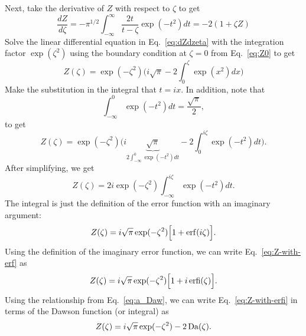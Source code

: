 Next, take the derivative of $Z$ with respect to $\zeta$ to get
\begin{equation}
	\frac{dZ}{d\zeta} = - \pi^{1/2} \int_{-\infty}^\infty
	\frac{2 t}{t-\zeta} \exp(-t^2)dt 
	= -2(1+\zeta Z) %
	\label{eq:dZdzeta}
\end{equation}
Solve the linear differential equation in Eq.~\ref{eq:dZdzeta} with the integration factor $\exp(\zeta^2)$ using the boundary condition at $\zeta=0$ from Eq.~\ref{eq:Z0} to get
\begin{equation}
	Z(\zeta) = \exp(-\zeta^2)
	\bigg( i\sqrt{\pi} - 2 \int_0^\zeta \exp(x^2)dx  \bigg)
\end{equation}
Make the substitution in the integral that $t = ix$. In addition, note that
\begin{equation}
	\int_{-\infty}^0 \exp(-t^2) dt = \frac{\sqrt{\pi}}{2},
\end{equation}
to get
\begin{equation}
	Z(\zeta) = \exp(-\zeta^2)
	\bigg( i\underbrace{\sqrt{\pi}}_{2\int_{-\infty}^0 \exp(-t^2)dt} - 2 \int_0^{i\zeta} \exp(-t^2)dt  \bigg).
\end{equation}
After simplifying, we get
\begin{equation}
	Z(\zeta) = 2i \exp(-\zeta^2) \int_{-\infty}^{i\zeta} \exp(-t^2)dt.
\end{equation}
The integral is just the definition of the error function with an imaginary argument:
\begin{equation}
	Z(\zeta) = i \sqrt{\pi} \exp(-\zeta^2) \Big[ 1 + \operatorname{erf}(i\zeta) \Big].
	\label{eq:Z-with-erf}
\end{equation}
Using the definition of the imaginary error function, we can write Eq.~\ref{eq:Z-with-erf} as
\begin{equation}
	Z(\zeta) = i\sqrt{\pi} \exp(-\zeta^2) \Big[ 1+i\operatorname{erfi}(\zeta) \Big].
	\label{eq:Z-with-erfi}
\end{equation}
Using the relationship from Eq.~\ref{eq:a_Daw}, we can write Eq.~\ref{eq:Z-with-erfi} in terms of the Dawson function (or integral) as
\begin{equation}
	Z(\zeta) = i \sqrt{\pi} \exp(-\zeta^2) - 2 \operatorname{Da}(\zeta).
	\label{eq:Z-with-Da}
\end{equation}

